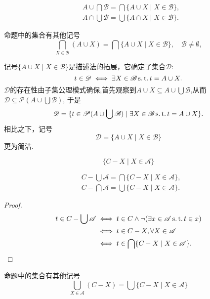 \begin{proposition}
\begin{align*}
    &A\cup\bigcap\mathscr{B}=\bigcap\{A\cup X\mid X\in\mathscr{B}\},\\
    &A\cap\bigcup\mathscr{B}=\bigcup\{A\cap X\mid X\in\mathscr{B}\}.
\end{align*}
\end{proposition}

\begin{note}
    命题中的集合有其他记号
    \[\bigcap_{X\in\mathscr{B}}(A\cup X)=\bigcap\{A\cup X\mid X\in\mathscr{B}\},\quad \mathscr{B}\ne\emptyset,\]
\end{note}

记号$\{A\cup X\mid X\in\mathscr{B}\}$是描述法的拓展，它确定了集合$\mathscr{D}$:
\[t\in\mathscr{D}\iff \exists X\in\mathscr{B}\operatorname{s.t.} t=A\cup X.\]
$\mathscr{D}$的存在性由子集公理模式确保,首先观察到$A\cup X\subseteq A\cup\bigcup\mathscr{B}$,从而$\mathscr{D}\subseteq\mathscr{P}(A\cup\bigcup\mathscr{B})$,
于是
\[\mathscr{D}=\{t\in\mathscr{P}(A\cup\bigcup\mathscr{B})\mid \exists X\in\mathscr{B}\operatorname{s.t.} t=A\cup X\}.\]
相比之下，记号
\[\mathscr{D}=\{A\cup X\mid X\in\mathscr{B}\}\]更为简洁.

\begin{example}%
    \[\{C-X\mid X\in\mathscr{A}\}\]
\end{example}

\begin{proposition}
    \begin{align*}
        &C-\bigcup\mathscr{A}=\bigcap\{C-X\mid X\in\mathscr{A}\},\\
        &C-\bigcap\mathscr{A}=\bigcup\{C-X\mid X\in\mathscr{A}\}.
    \end{align*}
\end{proposition}

\begin{proof}
    \begin{align*}
        t\in C-\bigcup\mathscr{A}
        &\iff t\in C \wedge\neg(\exists x\in\mathscr{A}\operatorname{s.t.} t\in x)\\
        &\iff t\in C-X,\forall X\in\mathscr{A}\\
        &\iff t\in\bigcap\{C-X\mid X\in\mathscr{A}\}.
    \end{align*}
\end{proof}

\begin{note}
    命题中的集合有其他记号
    \[\bigcup_{X\in\mathscr{A}}(C-X)=\bigcup\{C-X\mid X\in\mathscr{A}\}\]
\end{note}